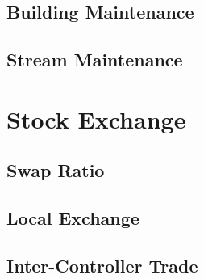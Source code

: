 \documentclass[a4paper,oneside,titlepage]{report}
\begin{document}
\subsection{Building Maintenance}
\subsection{Stream Maintenance} 

\section{Stock Exchange}
\subsection{Swap Ratio}
\subsection{Local Exchange}
\subsection{Inter-Controller Trade}
\end{document}
